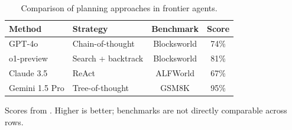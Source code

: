 \begin{table}[ht]
  \centering
  \caption{Comparison of planning approaches in frontier \LLM agents.}
  \label{tab:planning-methods}
  \begin{tabular}{@{}llcc@{}}
    \toprule
    \textbf{Method} & \textbf{Strategy} & \textbf{Benchmark} & \textbf{Score} \\
    \midrule
    GPT-4o          & Chain-of-thought  & Blocksworld        & 74\%           \\
    o1-preview      & Search + backtrack & Blocksworld       & 81\%           \\
    Claude 3.5      & ReAct             & ALFWorld           & 67\%           \\
    Gemini 1.5 Pro  & Tree-of-thought   & GSM8K              & 95\%           \\
    \bottomrule
  \end{tabular}
  \smallskip

  \footnotesize Scores from \cite{correa2025planningperformance}.
  Higher is better; benchmarks are not directly comparable across rows.
\end{table}
